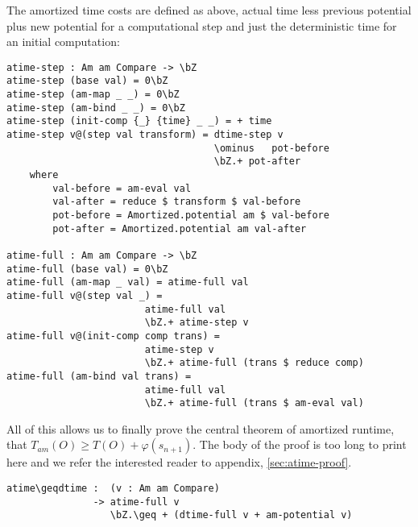 The amortized time costs are defined as above, actual time less previous potential plus new potential for a computational step and just the deterministic time for an initial computation:
\begin{lstlisting}[caption={Amortized time},label={lst:amortized:framework:amortizedtime},emph={dtime,atime,step,full}]
atime-step : Am am Compare -> \bZ
atime-step (base val) = 0\bZ
atime-step (am-map _ _) = 0\bZ
atime-step (am-bind _ _) = 0\bZ
atime-step (init-comp {_} {time} _ _) = + time
atime-step v@(step val transform) = dtime-step v
                                    \ominus   pot-before
                                    \bZ.+ pot-after
    where
        val-before = am-eval val
        val-after = reduce $ transform $ val-before
        pot-before = Amortized.potential am $ val-before
        pot-after = Amortized.potential am val-after

atime-full : Am am Compare -> \bZ
atime-full (base val) = 0\bZ
atime-full (am-map _ val) = atime-full val
atime-full v@(step val _) =
                        atime-full val
                        \bZ.+ atime-step v
atime-full v@(init-comp comp trans) =
                        atime-step v
                        \bZ.+ atime-full (trans $ reduce comp)
atime-full (am-bind val trans) =
                        atime-full val
                        \bZ.+ atime-full (trans $ am-eval val)
\end{lstlisting}

All of this allows us to finally prove the central theorem of amortized runtime, that $T_{am}(O) \geq T(O) + \varphi(s_{n+1})$. The body of the proof is too long to print here and we refer the interested reader to appendix, \autoref{sec:atime-proof}.

\begin{lstlisting}[caption={Theorem: Amortized time is an upper bound on actual time},emph={atime,dtime,pot,full,potential}]
atime\geqdtime :  (v : Am am Compare)
               -> atime-full v
                  \bZ.\geq + (dtime-full v + am-potential v)
\end{lstlisting}